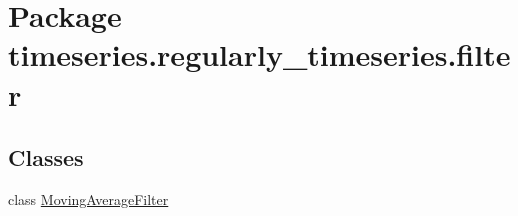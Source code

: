 \hypertarget{namespacetimeseries_1_1regularly__timeseries_1_1filter}{}\section{Package timeseries.\+regularly\+\_\+timeseries.\+filter}
\label{namespacetimeseries_1_1regularly__timeseries_1_1filter}
\subsection*{Classes}
\begin{DoxyCompactItemize}
\item 
class \hyperlink{classtimeseries_1_1regularly__timeseries_1_1filter_1_1_moving_average_filter}{Moving\+Average\+Filter}
\end{DoxyCompactItemize}

